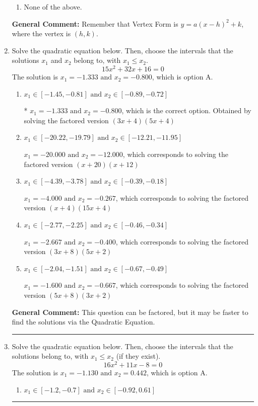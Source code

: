 \documentclass{extbook}[14pt]
\newcommand{\litem}[1]{\item #1

\rule{\textwidth}{0.4pt}}
\begin{document}
\begin{enumerate}
{\begin{enumerate}[label=\Alph*.]
\begin{multicols}{2}
\end{multicols}\item None of the above.\end{enumerate}
\textbf{General Comment:} Remember that Vertex Form is $y = a(x-h)^2+k$, where the vertex is $(h, k)$.
}
\litem{
Solve the quadratic equation below. Then, choose the intervals that the solutions $x_1$ and $x_2$ belong to, with $x_1 \leq x_2$.
\[ 15x^{2} +32 x + 16 = 0 \]The solution is \( x_1 = -1.333 \text{ and } x_2 = -0.800 \), which is option A.\begin{enumerate}[label=\Alph*.]
\item \( x_1 \in [-1.45, -0.81] \text{ and } x_2 \in [-0.89, -0.72] \)

* $x_1 = -1.333 \text{ and } x_2 = -0.800$, which is the correct option. Obtained by solving the factored version $(3x + 4)(5x + 4)$
\item \( x_1 \in [-20.22, -19.79] \text{ and } x_2 \in [-12.21, -11.95] \)

$x_1 = -20.000 \text{ and } x_2 = -12.000$, which corresponds to solving the factored version $(x + 20)(x + 12)$
\item \( x_1 \in [-4.39, -3.78] \text{ and } x_2 \in [-0.39, -0.18] \)

$x_1 = -4.000 \text{ and } x_2 = -0.267$, which corresponds to solving the factored version $(x + 4)(15x + 4)$
\item \( x_1 \in [-2.77, -2.25] \text{ and } x_2 \in [-0.46, -0.34] \)

$x_1 = -2.667 \text{ and } x_2 = -0.400$, which corresponds to solving the factored version $(3x + 8)(5x + 2)$
\item \( x_1 \in [-2.04, -1.51] \text{ and } x_2 \in [-0.67, -0.49] \)

$x_1 = -1.600 \text{ and } x_2 = -0.667$, which corresponds to solving the factored version $(5x + 8)(3x + 2)$
\end{enumerate}

\textbf{General Comment:} This question can be factored, but it may be faster to find the solutions via the Quadratic Equation.
}
\litem{
Solve the quadratic equation below. Then, choose the intervals that the solutions belong to, with $x_1 \leq x_2$ (if they exist).
\[ 16x^{2} +11 x -8 = 0 \]The solution is \( x_1 = -1.130 \text{ and } x_2 = 0.442 \), which is option A.\begin{enumerate}[label=\Alph*.]
\item \( x_1 \in [-1.2, -0.7] \text{ and } x_2 \in [-0.92, 0.61] \)


\end{enumerate}}
\end{enumerate}
\end{document}
